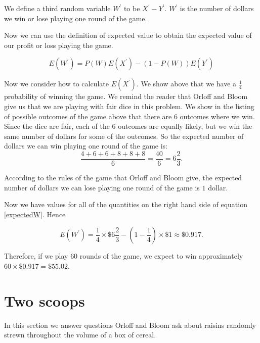 \documentclass[a4paper,11pt]{article}
\begin{document}
We define a third random variable $W^{\prime}$ to be  $X^{\prime}-Y^{\prime}$.
$W^{\prime}$ is the number of dollars we win or lose playing one round of the
game.

Now we can use the definition of expected value \cite{reading4a} to obtain the
expected value of our profit or loss playing the game.

\begin{equation} \label{expectedW}
E \left( W^{\prime} \right) = P\left( W \right) E \left( X^{\prime} \right)
	- \left( 1 - P \left(W \right)\right) E \left(Y^{\prime} \right)
\end{equation}

Now we consider how to calculate $E\left( X^{\prime} \right)$.  We show above that
we have a $\frac{1}{4}$ probability of winning the game.  We remind the reader
that Orloff and Bloom give us that we are playing with fair dice in this
problem. We show in the listing of possible outcomes of the game above that
there are $6$ outcomes where we win.  Since the dice are fair, each of the
$6$ outcomes are equally likely, but we win the same number of dollars
for some of the outcomes.  So the expected number of dollars we can win
playing one round of the game is:
\begin{equation}
	\frac{4+6+6+8+8+8}{6}=\frac{40}{6}=6\frac{2}{3}.
\end{equation}

According to the rules of the game that Orloff and Bloom give, the expected
number of dollars we can lose playing one round of the game is $1$ dollar.

Now we have values for all of the quantities on the right hand side of
equation \ref{expectedW}.  Hence

\begin{equation}
E \left( W^{\prime} \right) = \frac{1}{4}\times \$ 6 \frac{2}{3} -
	\left( 1 - \frac{1}{4} \right) \times \$ 1
	\approx \$0.917.
\end{equation}

Therefore, if we play $60$ rounds of the game, we expect to win approximately
$60 \times \$0.917 = \$55.02$.

\section{Two scoops}

In this section we answer questions Orloff and Bloom ask about raisins randomly
strewn throughout the volume of a box of cereal.
\end{document}
